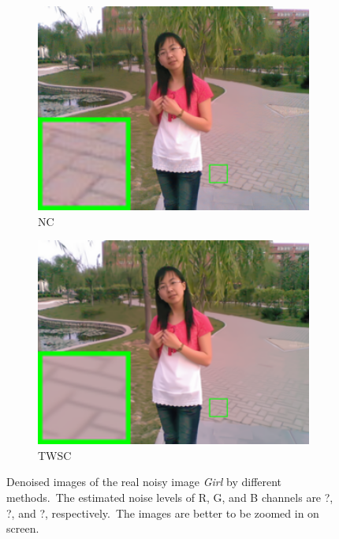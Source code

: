 \begin{figure}
\begin{subfigure}[t]{0.24\textwidth}
        \includegraphics[width=1\textwidth]{images/twsc/nc/resize_br_NC_chinesegirl.png}
		\caption{NC}
    \end{subfigure}
    \hfill
    \begin{subfigure}[t]{0.24\textwidth}
        \centering
        \includegraphics[width=1\textwidth]{images/twsc/nc/resize_br_TWSC_chinesegirl.png}
		\caption{TWSC}
    \end{subfigure}
    \caption{Denoised images of the real noisy image \textsl{Girl} \cite{ncwebsite} by different methods.\ The estimated noise levels of R, G, and B channels are ?, ?, and ?, respectively.\ The images are better to be zoomed in on screen.}
    \label{fig3}
\end{figure}



